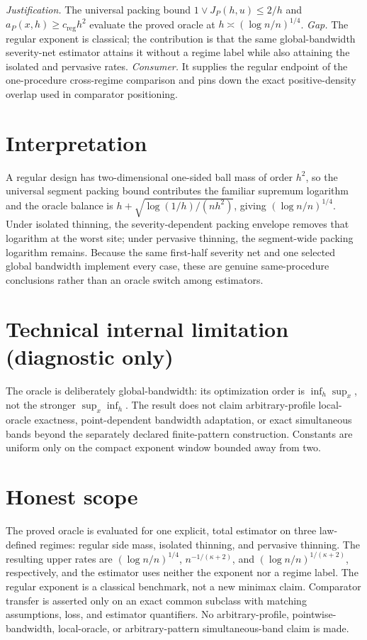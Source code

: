 \documentclass{article}
\begin{document}
\par\smallskip\noindent \textit{Justification.} The universal packing bound \(1\vee J_P(h,u)\leq2/h\) and \(a_P(x,h)\geq c_{\mathrm{reg}}h^2\) evaluate the proved oracle at \(h\asymp(\log n/n)^{1/4}\). \textit{Gap.} The regular exponent is classical; the contribution is that the same global-bandwidth severity-net estimator attains it without a regime label while also attaining the isolated and pervasive rates. \textit{Consumer.} It supplies the regular endpoint of the one-procedure cross-regime comparison and pins down the exact positive-density overlap used in comparator positioning.

\section{Interpretation}

A regular design has two-dimensional one-sided ball mass of order \(h^2\), so the universal segment packing bound contributes the familiar supremum logarithm and the oracle balance is \(h+\sqrt{\log(1/h)/(nh^2)}\), giving \((\log n/n)^{1/4}\). Under isolated thinning, the severity-dependent packing envelope removes that logarithm at the worst site; under pervasive thinning, the segment-wide packing logarithm remains. Because the same first-half severity net and one selected global bandwidth implement every case, these are genuine same-procedure conclusions rather than an oracle switch among estimators.

\section*{Technical internal limitation (diagnostic only)}

The oracle is deliberately global-bandwidth: its optimization order is \(\inf_h\sup_x\), not the stronger \(\sup_x\inf_h\). The result does not claim arbitrary-profile local-oracle exactness, point-dependent bandwidth adaptation, or exact simultaneous bands beyond the separately declared finite-pattern construction. Constants are uniform only on the compact exponent window bounded away from two.

\section{Honest scope}

The proved oracle is evaluated for one explicit, total estimator on three law-defined regimes: regular side mass, isolated thinning, and pervasive thinning. The resulting upper rates are \((\log n/n)^{1/4}\), \(n^{-1/(\kappa+2)}\), and \((\log n/n)^{1/(\kappa+2)}\), respectively, and the estimator uses neither the exponent nor a regime label. The regular exponent is a classical benchmark, not a new minimax claim. Comparator transfer is asserted only on an exact common subclass with matching assumptions, loss, and estimator quantifiers. No arbitrary-profile, pointwise-bandwidth, local-oracle, or arbitrary-pattern simultaneous-band claim is made.
\end{document}
